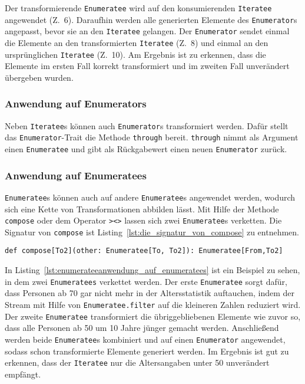 Der transformierende \lstinline|Enumeratee| wird auf den konsumierenden \lstinline|Iteratee| angewendet (Z.~6).
Daraufhin werden alle generierten Elemente des \lstinline|Enumerator|s angepasst, bevor sie an den \lstinline|Iteratee| gelangen.
Der \lstinline|Enumerator| sendet einmal die Elemente an den transformierten \lstinline|Iteratee| (Z.~8) und einmal an den ursprünglichen \lstinline|Iteratee| (Z.~10).
Am Ergebnis ist zu erkennen, dass die Elemente im ersten Fall korrekt transformiert und im zweiten Fall unverändert übergeben wurden.


\subsubsection{Anwendung auf Enumerators} %
\label{ssub:enumerateeanwendung_auf_enumerators}

Neben \lstinline|Iteratee|s können auch \lstinline|Enumerator|s transformiert werden.
Dafür stellt das \lstinline|Enumerator|-Trait die Methode \lstinline|through| bereit.
\lstinline|through| nimmt als Argument einen \lstinline|Enumeratee| und gibt als Rückgabewert einen neuen \lstinline|Enumerator| zurück.


\subsubsection{Anwendung auf Enumeratees} %
\label{ssub:enumerateeanwendung_auf_enumeratees}

\lstinline|Enumeratee|s können auch auf andere \lstinline|Enumeratee|s angewendet werden, wodurch sich eine Kette von Transformationen abbilden lässt.
Mit Hilfe der Methode \lstinline|compose| oder dem Operator \lstinline|><>| lassen sich zwei \lstinline|Enumeratee|s verketten.
Die Signatur von \lstinline|compose| ist Listing~\ref{lst:die_signatur_von_compose} zu entnehmen.
\begin{lstlisting}[caption=Die Signatur von compose, label=lst:die_signatur_von_compose]
def compose[To2](other: Enumeratee[To, To2]): Enumeratee[From,To2]
\end{lstlisting}

In Listing~\ref{lst:enumerateeanwendung_auf_enumeratees} ist ein Beispiel zu sehen, in dem zwei \lstinline|Enumeratees| verkettet werden.
Der erste \lstinline|Enumeratee| sorgt dafür, dass Personen ab 70 gar nicht mehr in der Altersstatistik auftauchen, indem der Stream mit Hilfe von \lstinline|Enumeratee.filter| auf die kleineren Zahlen reduziert wird.
Der zweite \lstinline|Enumeratee| transformiert die übriggebliebenen Elemente wie zuvor so, dass alle Personen ab 50 um 10 Jahre jünger gemacht werden.
Anschließend werden beide \lstinline|Enumeratee|s kombiniert und auf einen \lstinline|Enumerator| angewendet, sodass schon transformierte Elemente generiert werden.
Im Ergebnis ist gut zu erkennen, dass der \lstinline|Iteratee| nur die Altersangaben unter 50 unverändert empfängt.

